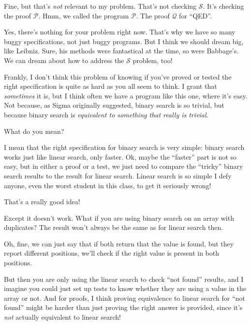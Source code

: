 \documentclass[sigplan]{acmart}
\begin{document}
   Fine, but that's \emph{not} relevant to
my problem.  That's not checking $\mathcal{S}$.  It's checking the
proof $\mathcal{P}$.  Hmm, we called the program $\mathcal{P}$.  The
proof $\mathcal{Q}$ for ``QED''.

  Yes, there's nothing for your problem
right now.  That's why we have so many buggy specifications, not just
buggy programs.  But I think we should dream big, like Leibniz.  Sure,
his methods were fantastical at the time, so were Babbage's.  We can
dream about how to address the $\mathcal{S}$ problem, too!


 Frankly, I don't think this problem of knowing if
you've proved or tested the right specification is quite as hard as
you all seem to think. I grant that \emph{sometimes} it is, but I
think often we have a program like this one, where it's easy.  Not
because, as Sigma originally suggested, binary search is so trivial,
but because binary search is \emph{equivalent to something that really
  is trivial.}

 What do you mean?

 I mean that the right specification for
binary search is very simple:  binary search works just like linear
search, only faster.  Ok, maybe the ``faster'' part is not so easy,
but in either a proof or a test, we just need to compare the
``tricky'' binary search results to the result for linear search.
Linear search is so simple I defy anyone, even the worst student in
this class, to get it seriously wrong!

  That's a really good idea!

  Except it doesn't work.   What if you are
using binary search on an array with duplicates?  The result won't
always be the same as for linear search  then.

 Oh, fine, we can just say that if both
return that the value is found, but they report different positions,
we'll check if the right value is present in both
positions.

 But then you are only using the linear
search to check ``not found'' results, and I imagine you could just
set up tests to know whether they are using a value in the array or
not.  And for proofs, I think proving equivalence to linear search for
``not found'' might be harder than just proving the right answer is
provided, since it's \emph{not} actually equivalent to linear search!
\end{document}
